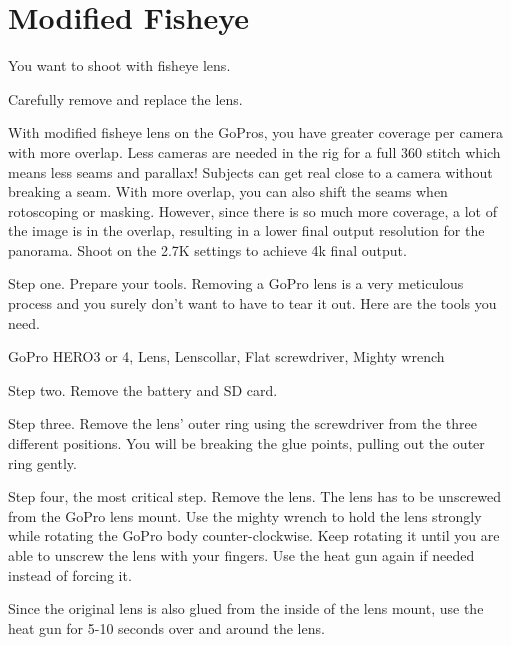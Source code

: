 \section{Modified Fisheye}
\pagecolor{white}
\label{chap:26}
\begin{fullwidth}

\problem

{\large You want to shoot with fisheye lens. \par}


\solution

{\large Carefully remove and replace the lens. \par}

With modified fisheye lens on the GoPros, you have greater coverage per camera with more overlap. Less cameras are needed in the rig for a full 360 stitch which means less seams and parallax! Subjects can get real close to a camera without breaking a seam. With more overlap, you can also shift the seams when rotoscoping or masking. However, since there is so much more coverage, a lot of the image is in the overlap, resulting in a lower final output resolution for the panorama. Shoot on the 2.7K settings to achieve 4k final output. 


Step one. Prepare your tools. Removing a GoPro lens is a very meticulous process and you surely don't want to have to tear it out. Here are the tools you need. 

GoPro HERO3 or 4, Lens, Lenscollar, Flat screwdriver, Mighty wrench


Step two. Remove the battery and SD card.


Step three. Remove the lens' outer ring using the screwdriver from the three different positions. You will be breaking the glue points, pulling out the outer ring gently.


Step four, the most critical step. Remove the lens. The lens has to be unscrewed from the GoPro lens mount. Use the mighty wrench to hold the lens strongly while rotating the GoPro body counter-clockwise. Keep rotating it until you are able to unscrew the lens with your fingers. Use the heat gun again if needed instead of forcing it.


\tip Since the original lens is also glued from the inside of the lens mount, use the heat gun for 5-10 seconds over and around the lens. 


\end{fullwidth}
